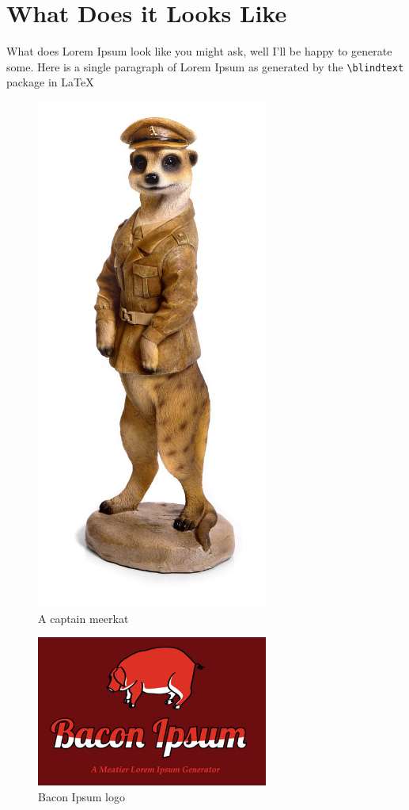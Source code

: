 \documentclass[11pt]{article}
\begin{document}
\section{What Does it Looks Like}
What does Lorem Ipsum look like you might ask, well I'll be happy to generate some.
Here is a single paragraph of Lorem Ipsum as generated by the \verb=\blindtext= package in \LaTeX\ \\
\indent
\blindtext
\begin{figure}[h]
\begin{center}
\includegraphics[width=3in, scale=0.5]{captainmeerkat.jpeg}
\end{center}
\caption{A captain meerkat~\cite{meerkat}}
\label{fig:meerkat}
\end{figure}

\begin{figure}
\begin{center}
\includegraphics[width=3in, scale=0.5]{bacon_ipsum.png}
\end{center}
\caption{Bacon Ipsum logo~\cite{bacon}}
\label{fig:bacon}
\end{figure}
\end{document}
